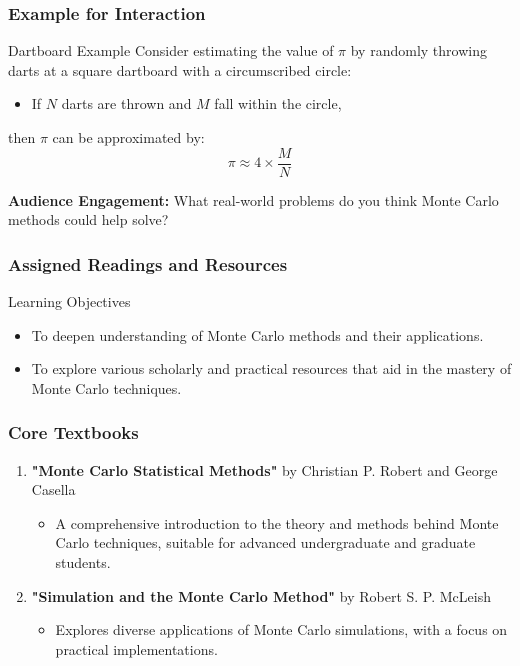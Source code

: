 \documentclass[aspectratio=169]{beamer}
\begin{document}
\begin{frame}[fragile]
    \frametitle{Example for Interaction}
    \begin{block}{Dartboard Example}
        Consider estimating the value of \( \pi \) by randomly throwing darts at a square dartboard with a circumscribed circle:
        \begin{itemize}
            \item If \( N \) darts are thrown and \( M \) fall within the circle,
        \end{itemize}
        then \( \pi \) can be approximated by:
        \[
        \pi \approx 4 \times \frac{M}{N}
        \]
    \end{block}
    \textbf{Audience Engagement:} What real-world problems do you think Monte Carlo methods could help solve? 
\end{frame}

\begin{frame}[fragile]
  \frametitle{Assigned Readings and Resources}
  
  \begin{block}{Learning Objectives}
      \begin{itemize}
          \item To deepen understanding of Monte Carlo methods and their applications.
          \item To explore various scholarly and practical resources that aid in the mastery of Monte Carlo techniques.
      \end{itemize}
  \end{block}  
\end{frame}

\begin{frame}[fragile]
  \frametitle{Core Textbooks}
  
  \begin{enumerate}
      \item \textbf{"Monte Carlo Statistical Methods"} by Christian P. Robert and George Casella
          \begin{itemize}
              \item A comprehensive introduction to the theory and methods behind Monte Carlo techniques, suitable for advanced undergraduate and graduate students.
          \end{itemize}
      \item \textbf{"Simulation and the Monte Carlo Method"} by Robert S. P. McLeish
          \begin{itemize}
              \item Explores diverse applications of Monte Carlo simulations, with a focus on practical implementations.
          \end{itemize}
  \end{enumerate}
\end{frame}
\end{document}
